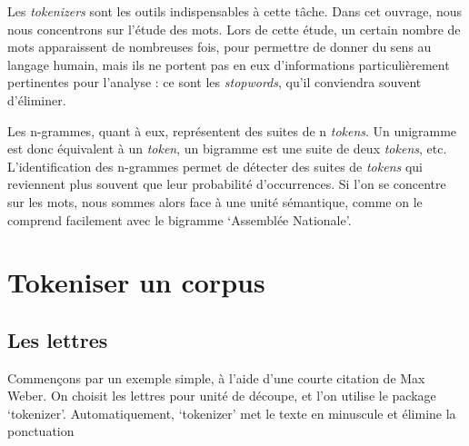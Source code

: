 \documentclass[
]{book}
\begin{document}
Les \emph{tokenizers} sont les outils indispensables à cette tâche. Dans cet ouvrage, nous nous concentrons sur l'étude des mots. Lors de cette étude, un certain nombre de mots apparaissent de nombreuses fois, pour permettre de donner du sens au langage humain, mais ils ne portent pas en eux d'informations particulièrement pertinentes pour l'analyse : ce sont les \emph{stopwords}, qu'il conviendra souvent d'éliminer.

Les n-grammes, quant à eux, représentent des suites de n \emph{tokens}. Un unigramme est donc équivalent à un \emph{token}, un bigramme est une suite de deux \emph{tokens}, etc. L'identification des n-grammes permet de détecter des suites de \emph{tokens} qui reviennent plus souvent que leur probabilité d'occurrences. Si l'on se concentre sur les mots, nous sommes alors face à une unité sémantique, comme on le comprend facilement avec le bigramme `Assemblée Nationale'.

\hypertarget{tokeniser-un-corpus}{%
\section{Tokeniser un corpus}\label{tokeniser-un-corpus}}

\hypertarget{les-lettres}{%
\subsection{Les lettres}\label{les-lettres}}

Commençons par un exemple simple, à l'aide d'une courte citation de Max Weber. On choisit les lettres pour unité de découpe, et l'on utilise le package `tokenizer'. Automatiquement, `tokenizer' met le texte en minuscule et élimine la ponctuation
\end{document}
